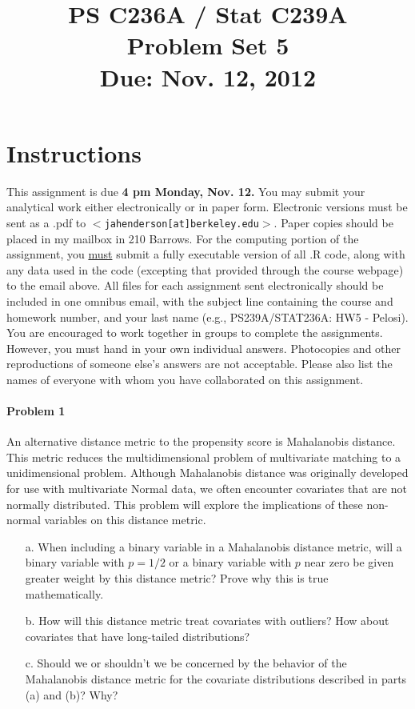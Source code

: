 \documentclass{article}
\title{PS C236A / Stat C239A \\ Problem Set 5 \\ Due: Nov. 12, 2012}
\date{}
\begin{document}
\maketitle
\vspace{-4em}
\section*{Instructions}
This assignment is due {\bf 4 pm Monday, Nov. 12.}  You may submit your
analytical work either electronically or in paper form.  Electronic
versions must be sent as a .pdf to
$<$\texttt{jahenderson[at]berkeley.edu}$>$. Paper copies should be
placed in my mailbox in 210 Barrows.  For the computing portion of the
assignment, you \underline{must} submit a fully executable version of
all .R code, along with any data used in the code (excepting that
provided through the course webpage) to the email above.  All files
for each assignment sent electronically should be included in one
omnibus email, with the subject line containing the course and
homework number, and your last name (e.g., PS239A/STAT236A: HW5 - Pelosi).\\


\noindent You are encouraged to work together in groups to complete
the assignments. However, you must hand in your own individual
answers. Photocopies and other reproductions of someone else’s answers
are not acceptable. Please also list the names of everyone with
whom you have collaborated on this assignment.




\paragraph{Problem 1}
 An alternative distance metric to the propensity score is
Mahalanobis distance. This metric reduces the multidimensional problem
of multivariate matching to a unidimensional problem. Although
Mahalanobis distance was originally developed for use with
multivariate Normal data, we often encounter covariates that are not
normally distributed. This problem will explore the implications of
these non-normal variables on this distance metric.
\vspace{1em}
\noindent 
   \begin{itemize}
     \item[a.]  When including a binary variable in a Mahalanobis distance metric,
will a binary variable with $p=1/2$ or a binary variable with $p$ near
zero be given greater weight by this distance metric? Prove why this
is true mathematically.
     \item[b.]
     How will this distance metric treat covariates with outliers? How
about covariates that have long-tailed distributions?
     \item[c.] Should we or shouldn’t we be concerned by the behavior of the
Mahalanobis distance metric for the covariate distributions described
in parts (a) and (b)? Why?
   \end{itemize}   
\end{document}
